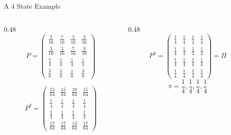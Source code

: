 \documentclass{beamer} %
\begin{document}
\begin{frame}{A 4 State Example}
\begin{columns}[c]

  \begin{column}{0.48\textwidth}
    \small
    \[
    P = \begin{pmatrix}
    \frac{3}{16} & \frac{7}{16} & \frac{3}{16} & \frac{3}{16} \\[3pt]
    \frac{3}{16} & \frac{3}{16} & \frac{7}{16} & \frac{3}{16} \\[3pt]
    \frac{1}{4}  & \frac{1}{4}  & \frac{1}{4}  & \frac{1}{4}  \\[3pt]
    \frac{3}{8}  & \frac{1}{8}  & \frac{1}{8}  & \frac{3}{8}
    \end{pmatrix}
    \]

    \[
    P^2 = \begin{pmatrix}
    \frac{15}{64} & \frac{15}{64} & \frac{19}{64} & \frac{15}{64} \\[3pt]
    \frac{1}{4}   & \frac{1}{4}   & \frac{1}{4}   & \frac{1}{4}   \\[3pt]
    \frac{1}{4}   & \frac{1}{4}   & \frac{1}{4}   & \frac{1}{4}   \\[3pt]
    \frac{17}{64} & \frac{17}{64} & \frac{13}{64} & \frac{17}{64}
    \end{pmatrix}
    \]

  \end{column}

  \begin{column}{0.48\textwidth}
    \small
    \[
    P^3 = \begin{pmatrix}
    \frac{1}{4} & \frac{1}{4} & \frac{1}{4} & \frac{1}{4} \\[3pt]
    \frac{1}{4} & \frac{1}{4} & \frac{1}{4} & \frac{1}{4} \\[3pt]
    \frac{1}{4} & \frac{1}{4} & \frac{1}{4} & \frac{1}{4} \\[3pt]
    \frac{1}{4} & \frac{1}{4} & \frac{1}{4} & \frac{1}{4}
    \end{pmatrix} = \Pi
    \]
    \[
    \pi = \frac{1}{4},\frac{1}{4},\frac{1}{4},\frac{1}{4}
    \]
  \end{column}

\end{columns}
\end{frame}
\end{document}
